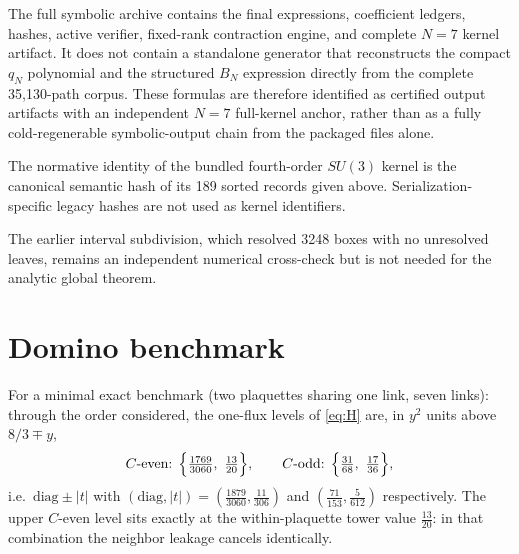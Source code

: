 \documentclass[11pt]{article}
\begin{document}
The full symbolic archive contains the final expressions, coefficient
ledgers, hashes, active verifier, fixed-rank contraction engine, and complete
$N=7$ kernel artifact. It does not contain a standalone generator that
reconstructs the compact $q_N$ polynomial and the structured $B_N$ expression
directly from the complete 35,130-path corpus. These formulas are therefore
identified as certified output artifacts with an independent $N=7$
full-kernel anchor, rather than as a fully cold-regenerable symbolic-output
chain from the packaged files alone.

The normative identity of the bundled fourth-order $SU(3)$ kernel is the
canonical semantic hash of its 189 sorted records given above. Serialization-
specific legacy hashes are not used as kernel identifiers.

The earlier interval subdivision, which resolved 3248 boxes with no
unresolved leaves, remains an independent numerical cross-check but is not
needed for the analytic global theorem.

\section{Domino benchmark}
\label{app:domino}

For a minimal exact benchmark (two plaquettes sharing one link, seven
links): through the order considered, the one-flux levels of \eqref{eq:H}
are, in $y^2$ units above $8/3\mp y$,
\begin{equation}
C\text{-even: }\Bigl\{\tfrac{1769}{3060},\ \tfrac{13}{20}\Bigr\},
\qquad
C\text{-odd: }\Bigl\{\tfrac{31}{68},\ \tfrac{17}{36}\Bigr\},
\end{equation}
i.e.\ $\mathrm{diag}\pm|t|$ with
$(\mathrm{diag},|t|)=(\tfrac{1879}{3060},\tfrac{11}{306})$ and
$(\tfrac{71}{153},\tfrac{5}{612})$ respectively. The upper $C$-even level
sits exactly at the within-plaquette tower value $\tfrac{13}{20}$: in that
combination the neighbor leakage cancels identically.
\end{document}
